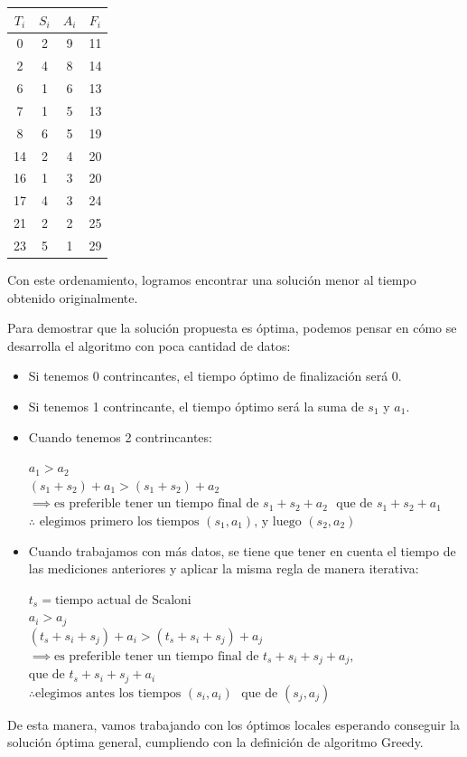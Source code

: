 \documentclass{estilo}
\begin{document}
\begin{center}
\begin{tabular}{|c|c|c|c|}
\hline
$T_i$ & $S_i$ & $A_i$ & $F_i$ \\
\hline
0 & 2 & 9 & 11 \\
2 & 4 & 8 & 14 \\
6 & 1 & 6 & 13 \\
7 & 1 & 5 & 13 \\
8 & 6 & 5 & 19 \\
14 & 2 & 4 & 20 \\
16 & 1 & 3 & 20 \\
17 & 4 & 3 & 24 \\
21 & 2 & 2 & 25 \\
23 & 5 & 1 & 29 \\
\hline
\end{tabular}
\end{center}

Con este ordenamiento, logramos encontrar una solución menor al tiempo obtenido originalmente.

Para demostrar que la solución propuesta es óptima, podemos pensar en cómo se desarrolla el algoritmo con poca cantidad de datos:
\begin{itemize}
    \item Si tenemos 0 contrincantes, el tiempo óptimo de finalización será 0.
    \item Si tenemos 1 contrincante, el tiempo óptimo será la suma de $s_1$ y $a_1$.
    \item Cuando tenemos 2 contrincantes:
    \begin{center}
        $a_1 > a_2$ \\
        $(s_1 + s_2) + a_1 > (s_1 + s_2) + a_2$ \\
        $\implies \text{es preferible tener un tiempo final de } s_1 + s_2 + a_2$
        $\text{ que de } s_1 + s_2 + a_1$\\
        $\therefore \text{ elegimos primero los tiempos  } (s_1, a_1) \text{, y luego } (s_2, a_2)$
    \end{center}
    \item Cuando trabajamos con más datos, se tiene que tener en cuenta el tiempo de las mediciones anteriores y aplicar la misma regla de manera iterativa:
    \begin{center}
        $t_s = \text{tiempo actual de Scaloni}$ \\
        $a_i > a_j$ \\
        $(t_s + s_i + s_j) + a_i > (t_s + s_i + s_j) + a_j$ \\
        $\implies \text{es preferible tener un tiempo final de } t_s + s_i + s_j + a_j,$ \\
        $\text{que de } t_s + s_i + s_j + a_i$ \\
        $\therefore \text{elegimos antes los tiempos } (s_i, a_i)$
        $\text{ que de } (s_j, a_j)$
    \end{center}
\end{itemize}
De esta manera, vamos trabajando con los óptimos locales esperando conseguir la solución óptima general, cumpliendo con la definición de algoritmo Greedy.
\end{document}

